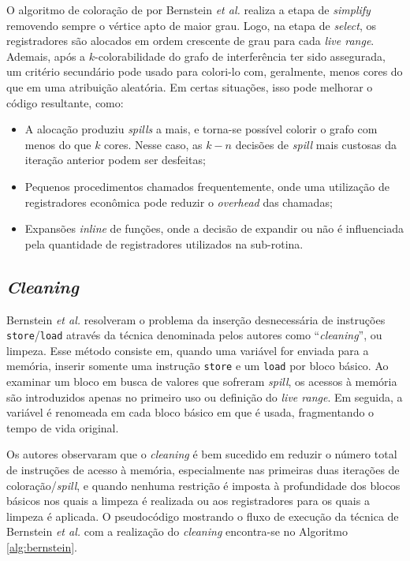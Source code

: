 \documentclass[
	12pt,				%
	openright,			%
	twoside,			%
	a4paper,			%
	tcc,			%
	]{ABNT-DC-UEL}
\begin{document}
O algoritmo de coloração de por Bernstein \textit{et al.} realiza a etapa de \textit{simplify} removendo sempre o vértice apto de maior grau. Logo, na etapa de \textit{select}, os registradores são alocados em ordem crescente de grau para cada \textit{live range}. Ademais, após a $k$-colorabilidade do grafo de interferência ter sido assegurada, um critério secundário pode usado para colori-lo com, geralmente, menos cores do que em uma atribuição aleatória. Em certas situações, isso pode melhorar o código resultante, como:

\begin{itemize}
    \item A alocação produziu \textit{spills} a mais, e torna-se possível colorir o grafo com menos do que $k$ cores. Nesse caso, as $k - n$ decisões de \textit{spill} mais custosas da iteração anterior podem ser desfeitas;
    \item Pequenos procedimentos chamados frequentemente, onde uma utilização de registradores econômica pode reduzir o \textit{overhead} das chamadas;
    \item Expansões \textit{inline} de funções, onde a decisão de expandir ou não é influenciada pela quantidade de registradores utilizados na sub-rotina.
\end{itemize}

\subsection{\textit{Cleaning}}

Bernstein \textit{et al.} \cite{bernstein:89} resolveram o problema da inserção desnecessária de instruções \texttt{store}/\texttt{load} através da técnica denominada pelos autores como ``\textit{cleaning}'', ou limpeza. Esse método consiste em, quando uma variável for enviada para a memória, inserir somente uma instrução \texttt{store} e um \texttt{load} por bloco básico. Ao examinar um bloco em busca de valores que sofreram \textit{spill}, os acessos à memória são introduzidos apenas no primeiro uso ou definição do \textit{live range}. Em seguida, a variável é renomeada em cada bloco básico em que é usada, fragmentando o tempo de vida original.

Os autores observaram que o \textit{cleaning} é bem sucedido em reduzir o número total de instruções de acesso à memória, especialmente nas primeiras duas iterações de coloração/\textit{spill}, e quando nenhuma restrição é imposta à profundidade dos blocos básicos nos quais a limpeza é realizada ou aos registradores para os quais a limpeza é aplicada. O pseudocódigo mostrando o fluxo de execução da técnica de Bernstein \textit{et al.} com a realização do \textit{cleaning} encontra-se no Algoritmo \ref{alg:bernstein}.
\end{document}

